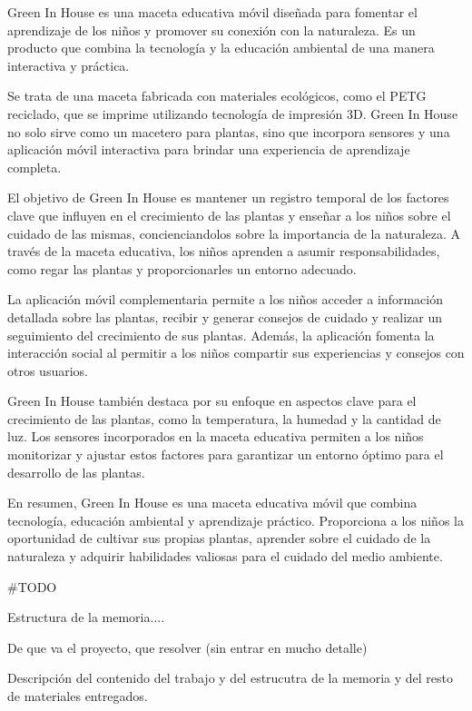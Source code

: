
Green In House es una maceta educativa móvil diseñada para fomentar el aprendizaje de los niños y promover su conexión con la naturaleza. Es un producto que combina la tecnología y la educación ambiental de una manera interactiva y práctica.

Se trata de una maceta fabricada con materiales ecológicos, como el PETG reciclado, que se imprime utilizando tecnología de impresión 3D. Green In House no solo sirve como un macetero para plantas, sino que incorpora sensores y una aplicación móvil interactiva para brindar una experiencia de aprendizaje completa.

El objetivo de Green In House es mantener un registro temporal de los factores clave que influyen en el crecimiento de las plantas y enseñar a los niños sobre el cuidado de las mismas, concienciandolos sobre la importancia de la naturaleza. A través de la maceta educativa, los niños aprenden a asumir responsabilidades, como regar las plantas y proporcionarles un entorno adecuado.

La aplicación móvil complementaria permite a los niños acceder a información detallada sobre las plantas, recibir y generar consejos de cuidado y realizar un seguimiento del crecimiento de sus plantas. Además, la aplicación fomenta la interacción social al permitir a los niños compartir sus experiencias y consejos con otros usuarios.

Green In House también destaca por su enfoque en aspectos clave para el crecimiento de las plantas, como la temperatura, la humedad y la cantidad de luz. Los sensores incorporados en la maceta educativa permiten a los niños monitorizar y ajustar estos factores para garantizar un entorno óptimo para el desarrollo de las plantas.

En resumen, Green In House es una maceta educativa móvil que combina tecnología, educación ambiental y aprendizaje práctico. Proporciona a los niños la oportunidad de cultivar sus propias plantas, aprender sobre el cuidado de la naturaleza y adquirir habilidades valiosas para el cuidado del medio ambiente.





#TODO

Estructura de la memoria....


De que va el proyecto, que resolver (sin entrar en mucho detalle)

Descripción del contenido del trabajo y del estrucutra de la memoria y del resto de materiales entregados.
